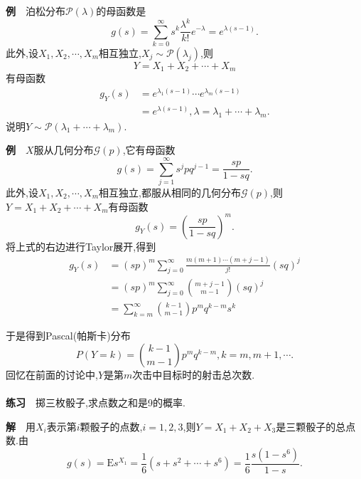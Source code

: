 \begin{frame}
	\textbf{例}$\quad$泊松分布$\mathcal{P}(\lambda)$的母函数是
	\begin{equation}
		g(s) = \sum_{k=0}^\infty s^k\frac{\lambda^k}{k!}e^{-\lambda} = e^{\lambda (s-1)}.
	\end{equation}
	此外,设$X_1,X_2,\cdots,X_m$相互独立,$X_j\sim \mathcal{P}(\lambda_j)$,则
	\begin{equation}
	Y = X_1+X_2+\cdots+X_m
	\end{equation}
	有母函数
	\begin{equation}
	\begin{split}
	g_Y(s) &= e^{\lambda_1 (s-1)}\cdots e^{\lambda_m (s-1)} \\
	&= e^{\lambda (s-1)},\lambda = \lambda_1+\cdots+\lambda_m.
	\end{split}
	\end{equation}
	说明$Y\sim\mathcal{P}(\lambda_1+\cdots+\lambda_m)$.
\end{frame}

\begin{frame}
	\textbf{例}$\quad$$X$服从几何分布$\mathcal{G}(p)$,它有母函数\begin{equation}
		g(s) = \sum_{j=1}^\infty s^jpq^{j-1} = \frac{sp}{1-sq}.
	\end{equation}
	此外,设$X_1,X_2,\cdots,X_m$相互独立,都服从相同的几何分布$\mathcal{G}(p)$,则
	$Y = X_1+X_2+\cdots+X_m$有母函数
	\begin{equation}
		g_Y(s) = \left(\frac{sp}{1-sq}\right)^m.
	\end{equation}
	将上式的右边进行Taylor展开,得到
	\begin{equation}
	\begin{split}
		g_Y(s) &= (sp)^m\sum_{j=0}^\infty \frac{m(m+1)\cdots(m+j-1)}{j!}(sq)^j \\
		&= (sp)^m\sum_{j=0}^\infty\binom{m+j-1}{m-1}(sq)^j \\
		&= \sum_{k=m}^\infty\binom{k-1}{m-1}p^mq^{k-m}s^k
	\end{split}
	\end{equation}
\end{frame}

\begin{frame}
	于是得到Pascal(帕斯卡)分布
	\begin{equation}
		P(Y=k) = \binom{k-1}{m-1}p^mq^{k-m},k=m,m+1,\cdots.
	\end{equation}
	回忆在前面的讨论中,$Y$是第$m$次击中目标时的射击总次数.
	\\ \hspace*{\fill} \\%
	\textbf{练习}$\quad$掷三枚骰子,求点数之和是9的概率.
	
	\textbf{解}$\quad$用$X_i$表示第$i$颗骰子的点数,$i=1,2,3$,则$Y=X_1+X_2+X_3$是三颗骰子的总点数.由
	\begin{equation}
		g(s) = \mathrm{E}s^{X_1} = \frac{1}{6}(s+s^2+\cdots+s^6) = \frac{1}{6}\frac{s(1-s^6)}{1-s}.
	\end{equation}
\end{frame}

